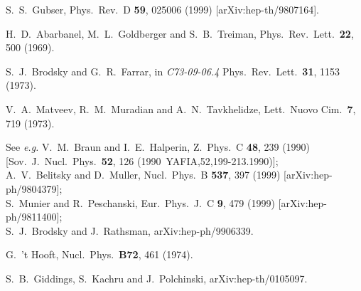 \begin{thebibliography}{}
S.~S.~Gubser,
Phys.\ Rev.\ D {\bf 59}, 025006 (1999)
[arXiv:hep-th/9807164].

H.~D.~Abarbanel, M.~L.~Goldberger and S.~B.~Treiman,
Phys.\ Rev.\ Lett.\  {\bf 22}, 500 (1969).

S.~J.~Brodsky and G.~R.~Farrar,
in {\it C73-09-06.4}
Phys.\ Rev.\ Lett.\  {\bf 31}, 1153 (1973).

V.~A.~Matveev, R.~M.~Muradian and A.~N.~Tavkhelidze,
Lett.\ Nuovo Cim.\  {\bf 7}, 719 (1973).

 See {\it e.g.}
V.~M.~Braun and I.~E.~Halperin,
Z.\ Phys.\ C {\bf 48}, 239 (1990)
[Sov.\ J.\ Nucl.\ Phys.\  {\bf 52}, 126 (1990\ YAFIA,52,199-213.1990)];\\
A.~V.~Belitsky and D.~Muller,
Nucl.\ Phys.\ B {\bf 537}, 397 (1999)
[arXiv:hep-ph/9804379];\\
S.~Munier and R.~Peschanski,
Eur.\ Phys.\ J.\ C {\bf 9}, 479 (1999)
[arXiv:hep-ph/9811400];\\
S.~J.~Brodsky and J.~Rathsman,
arXiv:hep-ph/9906339.

\end{thebibliography}






G.~'t Hooft,
Nucl.\ Phys.\  {\bf B72}, 461 (1974).

S.~B.~Giddings, S.~Kachru and J.~Polchinski,
arXiv:hep-th/0105097.
